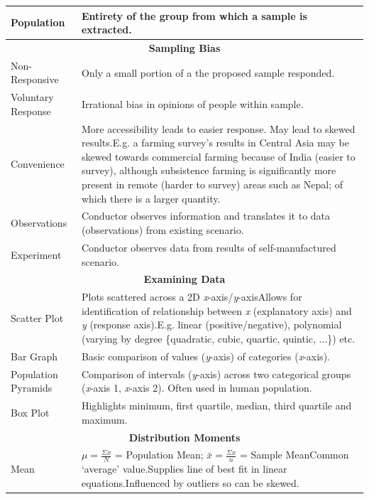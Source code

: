 \documentclass[11pt, english]{article}
\begin{document}
\begin{center}
\begin{longtable}{p{3cm}p{9cm}}
			Population & Entirety of the group from which a sample is extracted.\\
			\hline
			\multicolumn{2}{c}{\textbf{Sampling Bias}}\\
			\hline
			Non-Responsive & Only a small portion of a the proposed sample responded.\\
			Voluntary Response & Irrational bias in opinions of people within sample.\\
			Convenience & More accessibility leads to easier response. May lead to skewed results.\newline E.g. a farming survey’s results in Central Asia may be skewed towards commercial farming because of India (easier to survey), although subsistence farming is significantly more present in remote (harder to survey) areas such as Nepal; of which there is a larger quantity.\\
			Observations & Conductor observes information and translates it to data (observations) from existing scenario.\\
			Experiment & Conductor observes data from results of self-manufactured scenario.\\
			\hline
			\hline
			\multicolumn{2}{c}{\textbf{Examining Data}}\\
			\hline
			\hline
			Scatter Plot & Plots scattered across a 2D \textit{x}-axis/\textit{y}-axis\newline Allows for identification of relationship between \textit{x} (explanatory axis) and \textit{y} (response axis).\newline E.g. linear (positive/negative), polynomial (varying by degree \{quadratic, cubic, quartic, quintic, ...\}) etc.\\
			Bar Graph & Basic comparison of values (\textit{y}-axis) of categories (\textit{x}-axis).\\
			Population Pyramids & Comparison of intervals (\textit{y}-axis) across two categorical groups (\textit{x}-axis 1, \textit{x}-axis 2). Often used in human population.\\
			Box Plot & Highlights minimum, first quartile, median, third quartile and maximum.\\
			\hline
			\multicolumn{2}{c}{\textbf{Distribution Moments}}\\
			\hline
			Mean & $\mu=\frac{\Sigma x}{N}$ = Population Mean; $\bar{x}=\frac{\Sigma x}{n}$ = Sample Mean\newline Common `average’ value.\newline Supplies line of best fit in linear equations.\newline Influenced by outliers so can be skewed.\\

\end{longtable}
\end{center}
\end{document}
